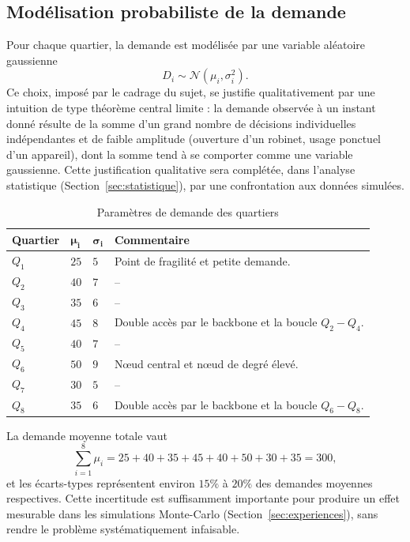 \documentclass[11pt]{ama-article}
\begin{document}
\subsection{Modélisation probabiliste de la demande}
\label{sec:probabiliste}

Pour chaque quartier, la demande est modélisée par une variable aléatoire gaussienne
\[
D_i \sim \mathcal{N}(\mu_i,\sigma_i^2).
\]
Ce choix, imposé par le cadrage du sujet, se justifie qualitativement par une intuition de type
théorème central limite : la demande observée à un instant donné résulte de la somme d'un grand
nombre de décisions individuelles indépendantes et de faible amplitude (ouverture d'un robinet,
usage ponctuel d'un appareil), dont la somme tend à se comporter comme une variable gaussienne.
Cette justification qualitative sera complétée, dans l'analyse statistique
(Section~\ref{sec:statistique}), par une confrontation aux données simulées.

\begin{table}[h!]
\centering
\begin{tabular}{>{\centering\arraybackslash}p{2cm}
                >{\centering\arraybackslash}p{2cm}
                >{\centering\arraybackslash}p{2cm}
                >{\raggedright\arraybackslash}p{8cm}}
\toprule
\textbf{Quartier} & $\boldsymbol{\mu_i}$ & $\boldsymbol{\sigma_i}$ & \textbf{Commentaire} \\
\midrule
$Q_1$ & $25$ & $5$ & Point de fragilité et petite demande. \\
$Q_2$ & $40$ & $7$ & -- \\
$Q_3$ & $35$ & $6$ & -- \\
$Q_4$ & $45$ & $8$ & Double accès par le backbone et la boucle $Q_2\!-\!Q_4$. \\
$Q_5$ & $40$ & $7$ & -- \\
$Q_6$ & $50$ & $9$ & Nœud central et nœud de degré élevé. \\
$Q_7$ & $30$ & $5$ & -- \\
$Q_8$ & $35$ & $6$ & Double accès par le backbone et la boucle $Q_6\!-\!Q_8$. \\
\bottomrule
\end{tabular}
\caption{Paramètres de demande des quartiers}
\end{table}

La demande moyenne totale vaut
\[
\sum_{i=1}^{8}\mu_i = 25+40+35+45+40+50+30+35 = 300,
\]
et les écarts-types représentent environ $15\%$ à $20\%$ des demandes moyennes respectives.
Cette incertitude est suffisamment importante pour produire un effet mesurable dans les
simulations Monte-Carlo (Section~\ref{sec:experiences}), sans rendre le problème
systématiquement infaisable.
\end{document}
